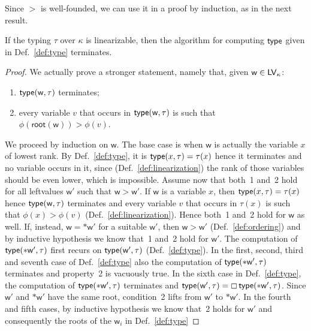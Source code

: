Since $>$ is well-founded, we can use it in a proof by induction, as in the next result.

\begin{proposition}\label{prop:termination}
  If the typing $\tau$ over $\kappa$ is linearizable, then the algorithm for computing $\mathsf{type}$ given in
  Def.~\ref{def:type} terminates.
\end{proposition}
\begin{proof}
  We actually prove a stronger statement, namely that, given $\mathsf{w}\in\mathsf{LV}_\kappa$:
  \begin{enumerate}
  \item $\mathsf{type}(\mathsf{w},\tau)$ terminates;
  \item every variable $v$ that occurs in $\mathsf{type}(\mathsf{w},\tau)$
    is such that $\phi(\mathsf{root}(\mathsf{w}))>\phi(v)$.
  \end{enumerate}
  We proceed by induction on $\mathsf{w}$. The base case is when $\mathsf{w}$ is actually the variable $x$
  of lowest rank. By Def.~\ref{def:type}, it is $\mathsf{type}(x,\tau)=\tau(x)$ hence it terminates and
  no variable occurs in it, since (Def.~\ref{def:linearization})
  the rank of those variables should be even lower, which is impossible.
  Assume now that both~1 and~2 hold for all leftvalues $\mathsf{w}'$ such that $\mathsf{w}>\mathsf{w}'$.
  If $\mathsf{w}$ is a variable $x$, then $\mathsf{type}(x,\tau)=\tau(x)$ hence
  $\mathsf{type}(\mathsf{w},\tau)$ terminates and every variable $v$ that occurs in $\tau(x)$ is such that
  $\phi(x)>\phi(v)$ (Def.~\ref{def:linearization}). Hence both~1 and~2 hold for $\mathsf{w}$ as well.
  If, instead, $\mathsf{w}=\mathtt{*}\mathsf{w}'$ for a suitable $\mathsf{w}'$,
  then $\mathsf{w}>\mathsf{w}'$ (Def.~\ref{def:ordering}) and by inductive hypothesis we know that~1
  and~2 hold for $\mathsf{w}'$. The computation of $\mathsf{type}(\mathtt{*}\mathsf{w}',\tau)$
  first recurs on $\mathsf{type}(\mathsf{w}',\tau)$ (Def.~\ref{def:type}).
  In the first, second, third and seventh case of Def.~\ref{def:type} also the
  computation of $\mathsf{type}(\mathtt{*}\mathsf{w}',\tau)$ terminates and property~2 is vacuously true.
  In the sixth case in Def.~\ref{def:type}, the computation of
  $\mathsf{type}(\mathtt{*}\mathsf{w}',\tau)$ terminates and
  $\mathsf{type}(\mathsf{w}',\tau)=\boxempty\,{\mathsf{type}(\mathtt{*}\mathsf{w}',\tau)}$.
  Since $\mathsf{w}'$ and $\mathtt{*}\mathsf{w}'$ have the same root, condition~2
  lifts from $\mathsf{w}'$ to $\mathtt{*}\mathsf{w}'$.
  In the fourth and fifth cases, by inductive hypothesis we know that~2 holds
  for $\mathsf{w}'$ and consequently the roots of the $\mathsf{w}_i$ in Def.~\ref{def:type}

\end{proof}
